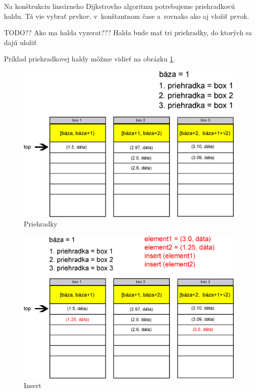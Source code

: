 Na konštrukciu lineárneho Dijkstrovho algoritmu potrebujeme priehradkovú haldu. Tá vie vybrať   prvkov.
v~konštantnom čase a~rovnako ako aj vložiť prvok.

TODO?? Ako ma halda vyzerat???
Halda bude mať tri priehradky, do ktorých sa dajú uložiť 

Príklad priehradkovej haldy môžme vidieť na obrázku 
\ref{fig:priehradky}. 


\begin{figure}[h]
\centering
\includegraphics[width=\textwidth]{./img/priehradky_naplnene_default.eps}
\caption{Priehradky}
\label{fig:priehradky}
\end{figure}


\begin{figure}[h]
\centering
\includegraphics[width=\textwidth]{./img/priehradky_naplnene_default_i.eps}
\caption{Insert}
\label{fig:priehradky_i}
\end{figure}

